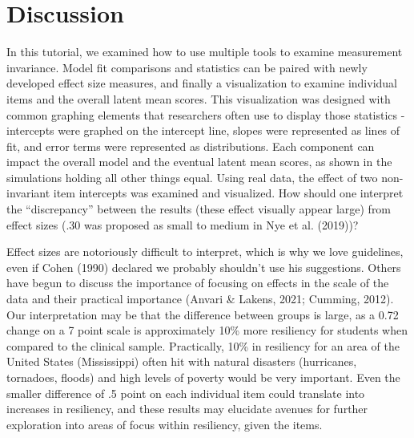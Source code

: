\documentclass[
  man]{apa7}
\begin{document}
\hypertarget{discussion}{%
\section{Discussion}\label{discussion}}

In this tutorial, we examined how to use multiple tools to examine measurement invariance. Model fit comparisons and statistics can be paired with newly developed effect size measures, and finally a visualization to examine individual items and the overall latent mean scores. This visualization was designed with common graphing elements that researchers often use to display those statistics - intercepts were graphed on the intercept line, slopes were represented as lines of fit, and error terms were represented as distributions. Each component can impact the overall model and the eventual latent mean scores, as shown in the simulations holding all other things equal. Using real data, the effect of two non-invariant item intercepts was examined and visualized. How should one interpret the ``discrepancy'' between the results (these effect visually appear large) from effect sizes (.30 was proposed as small to medium in Nye et al. (2019))?

Effect sizes are notoriously difficult to interpret, which is why we love guidelines, even if Cohen (1990) declared we probably shouldn't use his suggestions. Others have begun to discuss the importance of focusing on effects in the scale of the data and their practical importance (Anvari \& Lakens, 2021; Cumming, 2012). Our interpretation may be that the difference between groups is large, as a 0.72 change on a 7 point scale is approximately 10\% more resiliency for students when compared to the clinical sample. Practically, 10\% in resiliency for an area of the United States (Mississippi) often hit with natural disasters (hurricanes, tornadoes, floods) and high levels of poverty would be very important. Even the smaller difference of .5 point on each individual item could translate into increases in resiliency, and these results may elucidate avenues for further exploration into areas of focus within resiliency, given the items.
\end{document}
